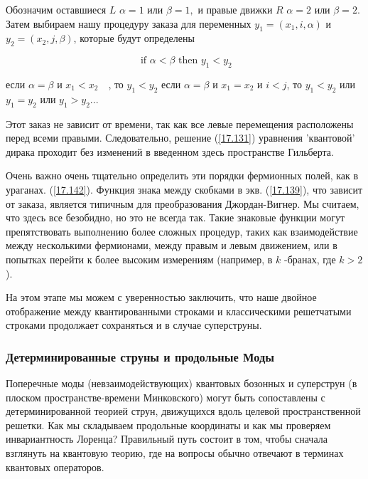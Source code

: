 \documentclass[main.tex]{subfiles}
\begin{document}
Обозначим оставшиеся $L$ $\alpha=1$ или $\beta=1,$ и правые движки $R$ $\alpha=2$ или $\beta=2 .$ Затем выбираем нашу процедуру заказа для переменных $y_{1}=\left(x_{1}, i, \alpha\right)$ и $y_{2}=\left(x_{2}, j, \beta\right)$, которые будут определены

\begin{equation}\label{17.142}
\text { if } \alpha<\beta \text { then } y_{1}<y_{2}
\end{equation}

если $\alpha=\beta$ и $x_{1}<x_{2} \quad$, то $y_{1}<y_{2}$ если $\alpha=\beta$ и $x_{1}=x_{2}$ и $i<j$, то $y_{1}<y_{2}$ или $y_{1}=y_{2}$ или $y_{1}>y_{2}$...

Этот заказ не зависит от времени, так как все левые перемещения расположены перед всеми правыми. Следовательно, решение (\ref{17.131}) уравнения 'квантовой' дирака проходит без изменений в введенном здесь пространстве Гильберта.

Очень важно очень тщательно определить эти порядки фермионных полей, как в ураганах. (\ref{17.142}). Функция знака между скобками в экв. (\ref{17.139}), что зависит от заказа, является типичным для преобразования Джордан-Вигнер. Мы считаем, что здесь все безобидно, но это не всегда так. Такие знаковые функции могут препятствовать выполнению более сложных процедур, таких как взаимодействие между несколькими фермионами, между правым и левым движением, или в попытках перейти к более высоким измерениям (например, в $k$ -бранах, где $k>2$).

На этом этапе мы можем с уверенностью заключить, что наше двойное отображение между квантированными строками и классическими решетчатыми строками продолжает сохраняться и в случае суперструны.



\subsubsection{Детерминированные струны и продольные Моды}\label{ch17.3.5}

Поперечные моды (невзаимодействующих) квантовых бозонных и суперструн (в плоском пространстве-времени Минковского) могут быть сопоставлены с детерминированной теорией струн, движущихся вдоль целевой пространственной решетки. Как мы складываем продольные координаты и как мы проверяем инвариантность Лоренца? Правильный путь состоит в том, чтобы сначала взглянуть на квантовую теорию, где на вопросы обычно отвечают в терминах квантовых операторов.
\end{document}
